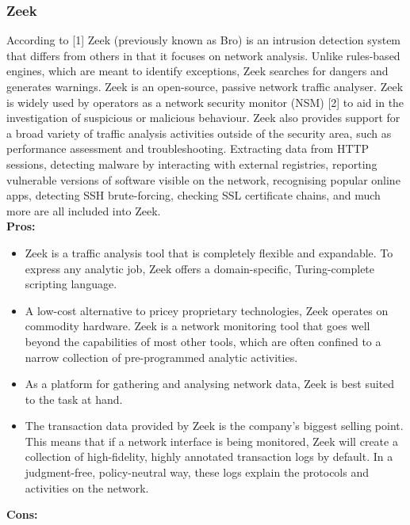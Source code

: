 \subsubsection{Zeek}

According to [1] Zeek (previously known as Bro) is an intrusion detection system that differs from others in that it focuses on network analysis. Unlike rules-based engines, which are meant to identify exceptions, Zeek searches for dangers and generates warnings. Zeek is an open-source, passive network traffic analyser. Zeek is widely used by operators as a network security monitor (NSM) [2] to aid in the investigation of suspicious or malicious behaviour. Zeek also provides support for a broad variety of traffic analysis activities outside of the security area, such as performance assessment and troubleshooting.
Extracting data from HTTP sessions, detecting malware by interacting with external registries, reporting vulnerable versions of software visible on the network, recognising popular online apps, detecting SSH brute-forcing, checking SSL certificate chains, and much more are all included into Zeek.
\\

{\bfseries{Pros:}}

\begin{itemize}
    \item Zeek is a traffic analysis tool that is completely flexible and expandable. To express any analytic job, Zeek offers a domain-specific, Turing-complete scripting language.
    \item A low-cost alternative to pricey proprietary technologies, Zeek operates on commodity hardware. Zeek is a network monitoring tool that goes well beyond the capabilities of most other tools, which are often confined to a narrow collection of pre-programmed analytic activities.
    \item As a platform for gathering and analysing network data, Zeek is best suited to the task at hand.
    \item The transaction data provided by Zeek is the company's biggest selling point. This means that if a network interface is being monitored, Zeek will create a collection of high-fidelity, highly annotated transaction logs by default. In a judgment-free, policy-neutral way, these logs explain the protocols and activities on the network.
    \\
\end{itemize}

{\bfseries{Cons:}}


